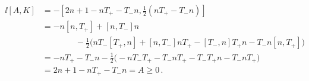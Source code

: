 \begin{equation}
\begin{split}
\ii[A,K] &= -[2n+1 - nT_+ - T_-n, {\textstyle\frac12}(nT_+-T_-n)] \\
&= - n[n,T_+] + [n,T_-]n  \\ &\qquad\qquad-{\textstyle\frac12}\bigl(
nT_-[T_+,n] + [n,T_-]nT_+ - [T_-,n]T_+n - T_-n[n,T_+]\bigr) \\
&= - nT_+ - T_-n - {\textstyle\frac12}\bigl( 
-nT_-T_+ - T_-nT_+ - T_-T_+n -T_-nT_+\bigr) \\
&= 2n+1 - nT_+ - T_-n = A \ge 0 \,.
\end{split} 
\end{equation}

